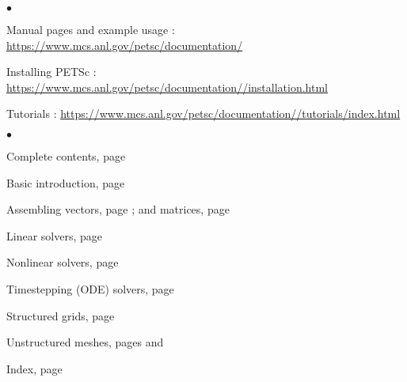 
%

\medskip\medskip


\medskip


\begin{list}{$\bullet$}
{
\setlength{\itemsep}{-.020in}
\setlength{\topsep}{0in}
\setlength{\partopsep}{0in}
}
\item Manual pages and example usage :
\href{https://www.mcs.anl.gov/petsc/documentation/}{https://www.mcs.anl.gov/petsc/documentation/}
\item Installing PETSc :
\href{https://www.mcs.anl.gov/petsc/documentation//installation.html}{https://www.mcs.anl.gov/petsc/documentation//installation.html}
\item Tutorials : \href{https://www.mcs.anl.gov/petsc/documentation//tutorials/index.html}{https://www.mcs.anl.gov/petsc/documentation//tutorials/index.html} 
\end{list}

\medskip
{}
\begin{list}{$\bullet$}
{
\setlength{\itemsep}{-.02in}
\setlength{\topsep}{.02in}
\setlength{\partopsep}{0in}
}
\item Complete contents, page \pageref{tableofcontents}
\item Basic introduction, page \pageref{sec_gettingstarted}
\item Assembling vectors, page \pageref{sec_vecbasic}; and matrices, page \pageref{chapter_matrices}
\item Linear solvers, page \pageref{ch_ksp}
\item Nonlinear solvers, page \pageref{chapter_snes}
\item Timestepping (ODE) solvers, page \pageref{chapter_ts}
\item Structured grids, page \pageref{sec_struct} 
\item Unstructured meshes, pages \pageref{sec_unstruct} and \pageref{ch_unstructured}
\item Index, page \pageref{ch_index}
\end{list}

